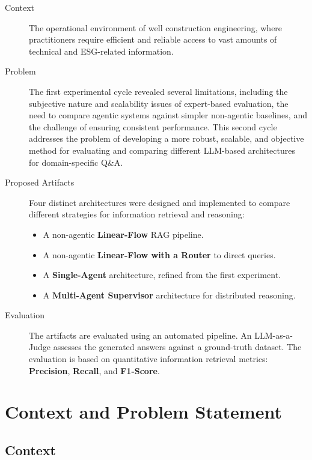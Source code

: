     \begin{description}
        \item[Context] The operational environment of well construction engineering, where practitioners require efficient and reliable access to vast amounts of technical and ESG-related information.

        \item[Problem] The first experimental cycle revealed several limitations, including the subjective nature and scalability issues of expert-based evaluation, the need to compare agentic systems against simpler non-agentic baselines, and the challenge of ensuring consistent performance. This second cycle addresses the problem of developing a more robust, scalable, and objective method for evaluating and comparing different LLM-based architectures for domain-specific Q\&A.

        \item[Proposed Artifacts] Four distinct architectures were designed and implemented to compare different strategies for information retrieval and reasoning:
        \begin{itemize}
            \item A non-agentic \textbf{Linear-Flow} RAG pipeline.
            \item A non-agentic \textbf{Linear-Flow with a Router} to direct queries.
            \item A \textbf{Single-Agent} architecture, refined from the first experiment.
            \item A \textbf{Multi-Agent Supervisor} architecture for distributed reasoning.
        \end{itemize}

        \item[Evaluation] The artifacts are evaluated using an automated pipeline. An LLM-as-a-Judge assesses the generated answers against a ground-truth dataset. The evaluation is based on quantitative information retrieval metrics: \textbf{Precision}, \textbf{Recall}, and \textbf{F1-Score}.
    \end{description}

\section{Context and Problem Statement}

    \subsection{Context}


